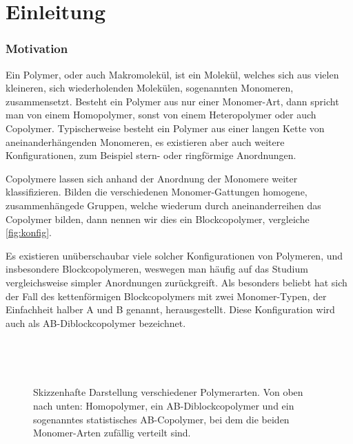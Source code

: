 
\chapter{Einleitung} %
\label{cha:einleitung}

\subsection*{Motivation} %
\label{sec:motivation}

Ein Polymer, oder auch Makromolekül, ist ein Molekül, welches sich aus vielen kleineren, sich wiederholenden Molekülen, sogenannten Monomeren, zusammensetzt.
Besteht ein Polymer aus nur einer Monomer-Art, dann spricht man von einem Homopolymer, sonst von einem Heteropolymer oder auch Copolymer.
Typischerweise besteht ein Polymer aus einer langen Kette von aneinanderhängenden Monomeren, es existieren aber auch weitere Konfigurationen, zum Beispiel stern- oder ringförmige Anordnungen.

Copolymere lassen sich anhand der Anordnung der Monomere weiter klassifizieren.
Bilden die verschiedenen Monomer-Gattungen homogene, zusammenhängede Gruppen, welche wiederum durch aneinanderreihen das Copolymer bilden, dann nennen wir dies ein Blockcopolymer, vergleiche \autoref{fig:konfig}.

Es existieren unüberschaubar viele solcher Konfigurationen von Polymeren, und insbesondere Blockcopolymeren, weswegen man häufig auf das Studium vergleichsweise simpler Anordnungen zurückgreift.
Als besonders beliebt hat sich der Fall des kettenförmigen Blockcopolymers mit zwei Monomer-Typen, der Einfachheit halber A und B genannt, herausgestellt.
Diese Konfiguration wird auch als AB-Diblockcopolymer bezeichnet.

\begin{figure}[tb]
    \centering
    \begin{subfigure}[b]{\textwidth}
        \centering
        
    \end{subfigure}
    \\[1em]
    \begin{subfigure}[b]{\textwidth}
        \centering
        
    \end{subfigure}
    \\[1em]
    \begin{subfigure}[b]{\textwidth}
        \centering
        
    \end{subfigure}
    \caption[Skizzenhafte Darstellung verschiedener Polymerarten]{%
        Skizzenhafte Darstellung verschiedener Polymerarten.
        Von oben nach unten: Homopolymer, ein AB-Diblockcopolymer und ein sogenanntes statistisches AB-Copolymer, bei dem die beiden Monomer-Arten zufällig verteilt sind.
    }
    \label{fig:konfig}
\end{figure}

